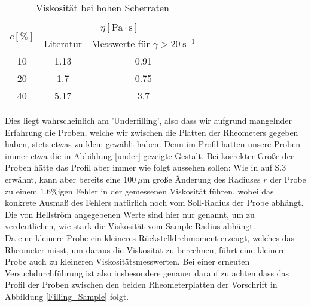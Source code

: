 \documentclass[11pt,a4paper,oneside]{scrartcl}
\begin{document}
\begin{table}[H]
\centering

\begin{tabular}{c|c|c} 
\multirow{2}{*}{$c[\%]$} & \multicolumn{2}{c}{$\eta[\mathrm{Pa\cdot s}]$}         \\ 
\cline{2-3}
                         & Literatur & Messwerte für $\gamma>20\ \mathrm s^{-1}$  \\ 
\hline
10                       & 1.13      & 0.91                                       \\
20                       & 1.7       & 0.75                                       \\
40                       & 5.17      & 3.7                                        \\
\bottomrule
\end{tabular}
\caption{Viskosität bei hohen Scherraten}
\label{table_guido}
\end{table}
Dies liegt wahrscheinlich am 'Underfilling', also dass wir aufgrund mangelnder Erfahrung
die Proben, welche wir zwischen die Platten der Rheometers gegeben haben, stets etwas zu klein gewählt haben. Denn im Profil hatten unsere Proben immer etwa die in Abbildung \ref{under} gezeigte Gestalt. Bei
korrekter Größe der Proben hätte das Profil aber immer wie folgt aussehen sollen:
Wie in \cite{Hellström_2015} auf S.3 erwähnt, kann aber 
bereits eine $100\ \mu \mathrm m$ große Änderung des Radiuses $r$ der Probe zu einem $1.6\%$igen  Fehler in der gemessenen Viskosität führen, wobei das konkrete Ausmaß des Fehlers natürlich noch vom Soll-Radius der Probe abhängt. Die von Hellström angegebenen Werte sind hier nur genannt, um zu verdeutlichen, wie stark die Viskosität vom Sample-Radius abhängt.\\
Da eine kleinere Probe ein kleineres Rückstelldrehmoment erzeugt,
welches das Rheometer misst, um daraus die Viskosität zu berechnen, führt eine kleinere Probe auch zu kleineren Viskositätsmesswerten. Bei einer erneuten Versuchdurchführung ist also insbesondere genauer darauf zu achten
dass das Profil der Proben zwischen den beiden Rheometerplatten der Vorschrift in Abbildung \ref{Filling_Sample} folgt.
\end{document}
